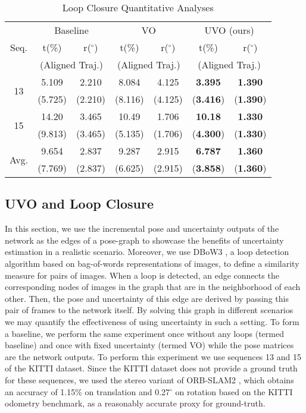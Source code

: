 \documentclass[letterpaper, 10 pt]{ieeeconf}  %
\begin{document}
\begin{table}[!t]
    \centering
    \caption{Loop Closure Quantitative Analyses}
    \setlength{\tabcolsep}{0.55\tabcolsep}
    \begin{tabular}{c|cc|cc|cc} \toprule
        \multirow{3}{*}{Seq.} & \multicolumn{2}{c}{Baseline} & \multicolumn{2}{c}{VO} & \multicolumn{2}{c}{UVO (ours)} \\
               & t(\%) & r($^\circ$) & t(\%) & r($^\circ$) & t(\%) & r($^\circ$) \\
               & \multicolumn{2}{c}{(Aligned Traj.)} & \multicolumn{2}{c}{(Aligned Traj.)} & \multicolumn{2}{c}{(Aligned Traj.)}\\\midrule
        \multirow{2}{*}{13} & 5.109 & 2.210 & 8.084 & 4.125 & \textbf{3.395} & \textbf{1.390}\\
           & (5.725) & (2.210) & (8.116) & (4.125) & (\textbf{3.416}) & (\textbf{1.390})\\\midrule
        \multirow{2}{*}{15} & 14.20 & 3.465 & 10.49 & 1.706 & \textbf{10.18} & \textbf{1.330}\\
           & (9.813) & (3.465) & (5.135) & (1.706) & (\textbf{4.300}) & (\textbf{1.330})\\\midrule
        \multirow{2}{*}{Avg.} & 9.654 & 2.837 & 9.287 & 2.915 & \textbf{6.787} & \textbf{1.360} \\
           & (7.769) & (2.837) & (6.625) & (2.915) & (\textbf{3.858}) & (\textbf{1.360})\\
        \bottomrule
    \end{tabular}
    \label{tab:loopclosure}
\end{table}
\subsection{UVO and Loop Closure}
In this section, we use the incremental pose and uncertainty outputs of the network as the edges of a pose-graph to showcase the benefits of uncertainty estimation in a realistic scenario.
Moreover, we use DBoW3 \cite{galvez2012bags}, a loop detection algorithm based on bag-of-words representations of images, to define a similarity measure for pairs of images. When a loop is detected, an edge connects the corresponding nodes of images in the graph that are in the neighborhood of each other. Then, the pose and uncertainty of this edge are derived by passing this pair of frames to the network itself.
By solving this graph in different scenarios we may quantify the effectiveness of using uncertainty in such a setting. To form a baseline, we perform the same experiment once without any loops (termed baseline) and once with fixed uncertainty (termed VO) while the pose matrices are the network outputs. To perform this experiment we use sequences 13 and 15 of the KITTI dataset. Since the KITTI dataset does not provide a ground truth for these sequences, we used the stereo variant of ORB-SLAM2 \cite{mur2017orb}, which obtains an accuracy of 1.15\% on translation and 0.27$^\circ$ on rotation based on the KITTI odometry benchmark, as a reasonably accurate proxy for ground-truth.
\end{document}

